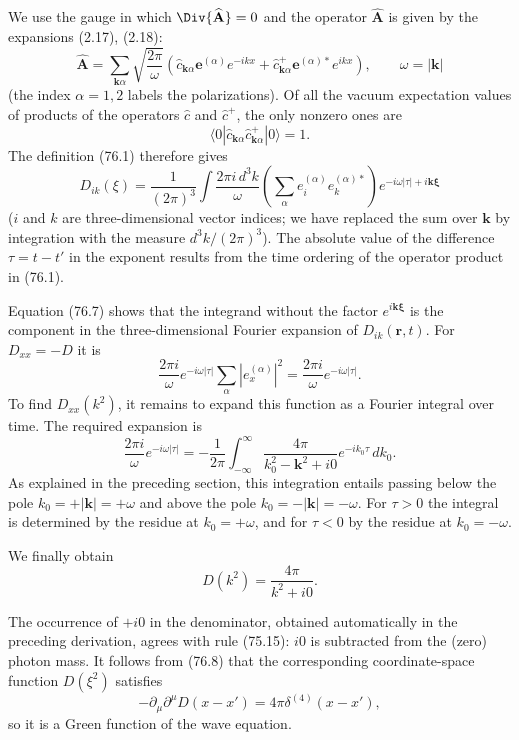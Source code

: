 We use the gauge in which $\Div{\widehat{\mathbf A}}=0$ and the operator $\widehat{\mathbf A}$ is given by the expansions (2.17), (2.18):
\begin{equation}
\widehat{\mathbf A}=\sum_{\mathbf k\alpha}\sqrt{\frac{2\pi}{\omega}}\left(\widehat c_{\mathbf k\alpha}\mathbf e^{(\alpha)}e^{-ikx}+\widehat c^{+}_{\mathbf k\alpha}\mathbf e^{(\alpha)*}e^{ikx}\right),
\qquad \omega=|\mathbf k|
\tag{76.6}
\end{equation}
(the index $\alpha=1,2$ labels the polarizations). Of all the vacuum expectation values of products of the operators $\widehat c$ and $\widehat c^+$, the only nonzero ones are
\[
\langle 0|\widehat c_{\mathbf k\alpha}\widehat c^+_{\mathbf k\alpha}|0\rangle=1.
\]
The definition (76.1) therefore gives
\begin{equation}
D_{ik}(\xi)=\frac{1}{(2\pi)^3}\int\frac{2\pi i\,d^3k}{\omega}
\left(\sum_\alpha e_i^{(\alpha)}e_k^{(\alpha)*}\right)
e^{-i\omega|\tau|+i\mathbf k\boldsymbol\xi}
\tag{76.7}
\end{equation}
($i$ and $k$ are three-dimensional vector indices; we have replaced the sum over $\mathbf k$ by integration with the measure $d^3k/(2\pi)^3$). The absolute value of the difference $\tau=t-t'$ in the exponent results from the time ordering of the operator product in (76.1).

Equation (76.7) shows that the integrand without the factor $e^{i\mathbf k\boldsymbol\xi}$ is the component in the three-dimensional Fourier expansion of $D_{ik}(\mathbf r,t)$. For $D_{xx}=-D$ it is
\[
\frac{2\pi i}{\omega}e^{-i\omega|\tau|}\sum_\alpha|e_x^{(\alpha)}|^2
=\frac{2\pi i}{\omega}e^{-i\omega|\tau|}.
\]
To find $D_{xx}(k^2)$, it remains to expand this function as a Fourier integral over time. The required expansion is
\[
\frac{2\pi i}{\omega}e^{-i\omega|\tau|}
=-\frac{1}{2\pi}\int_{-\infty}^{\infty}
\frac{4\pi}{k_0^2-\mathbf k^2+i0}e^{-ik_0\tau}\,dk_0.
\]
As explained in the preceding section, this integration entails passing below the pole $k_0=+|\mathbf k|=+\omega$ and above the pole $k_0=-|\mathbf k|=-\omega$. For $\tau>0$ the integral is determined by the residue at $k_0=+\omega$, and for $\tau<0$ by the residue at $k_0=-\omega$.

We finally obtain
\begin{equation}
D(k^2)=\frac{4\pi}{k^2+i0}.
\tag{76.8}
\end{equation}

The occurrence of $+i0$ in the denominator, obtained automatically in the preceding derivation, agrees with rule (75.15): $i0$ is subtracted from the (zero) photon mass. It follows from (76.8) that the corresponding coordinate-space function $D(\xi^2)$ satisfies
\begin{equation}
-\partial_\mu\partial^\mu D(x-x')=4\pi\delta^{(4)}(x-x'),
\tag{76.9}
\end{equation}
so it is a Green function of the wave equation.

